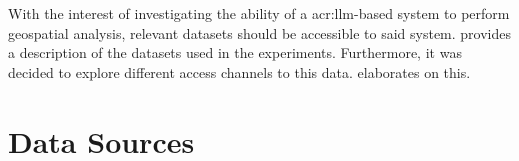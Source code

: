 \begin{comment}
\textit{Morbi viverra ante et tortor faucibus finibus nec sit amet sem. In ultrices, augue sed vestibulum congue, tortor turpis sodales odio, at interdum leo justo non massa. Nunc aliquet, nisl non vestibulum rhoncus, libero tortor laoreet nibh, vel ultricies nunc erat nec nisl. Praesent sed lorem arcu. Sed ultricies, tellus at euismod posuere, felis nibh cursus justo, vitae placerat nisl lorem ut est. Suspendisse sollicitudin sagittis nibh, ac interdum erat hendrerit id. Fusce est mi, semper eget mauris sed, posuere ultrices orci. Aenean nec est eu augue blandit maximus. Morbi ut nisl at metus condimentum tincidunt nec consectetur nibh. Phasellus eleifend dapibus elit ut cursus. Donec lacinia turpis a justo dignissim, sit amet venenatis libero pellentesque. Orci varius natoque penatibus et magnis dis parturient montes, nascetur ridiculus mus.}
\end{comment}

With the interest of investigating the ability of a \gls{acr:llm}-based system to perform geospatial analysis, relevant datasets should be accessible to said system.  provides a description of the datasets used in the experiments. Furthermore, it was decided to explore different access channels to this data.  elaborates on this.

\section{Data Sources}
\label{sec:data-sources}

